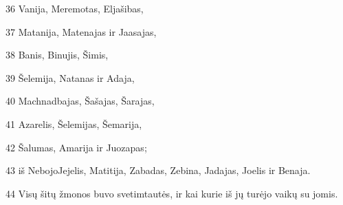 \par 36 Vanija, Meremotas, Eljašibas, 
\par 37 Matanija, Matenajas ir Jaasajas, 
\par 38 Banis, Binujis, Šimis, 
\par 39 Šelemija, Natanas ir Adaja, 
\par 40 Machnadbajas, Šašajas, Šarajas, 
\par 41 Azarelis, Šelemijas, Šemarija, 
\par 42 Šalumas, Amarija ir Juozapas; 
\par 43 iš Nebojo­Jejelis, Matitija, Zabadas, Zebina, Jadajas, Joelis ir Benaja. 
\par 44 Visų šitų žmonos buvo svetimtautės, ir kai kurie iš jų turėjo vaikų su jomis.



